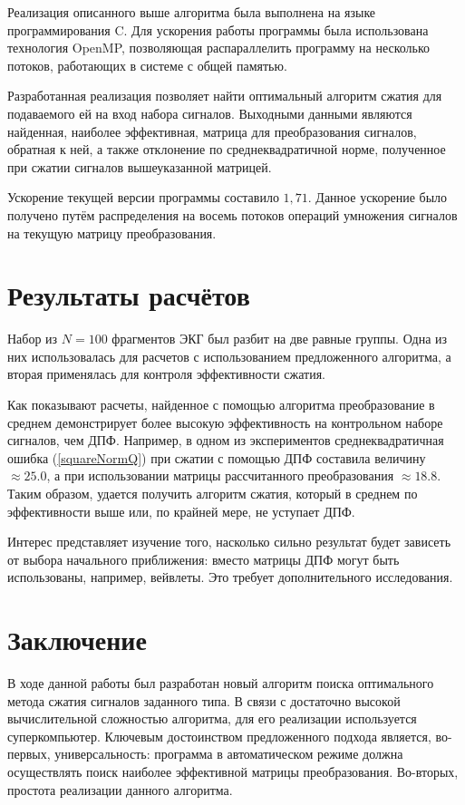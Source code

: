 \documentclass[11pt, oneside, a4paper]{article}
\begin{document}
Реализация описанного выше алгоритма была выполнена на языке программирования C. Для ускорения работы программы была использована технология OpenMP, позволяющая распараллелить программу на несколько потоков, работающих в системе с общей памятью. 

Разработанная реализация позволяет найти оптимальный алгоритм сжатия для подаваемого ей на вход набора сигналов. Выходными данными являются найденная, наиболее эффективная, матрица для преобразования сигналов, обратная к ней, а также отклонение по среднеквадратичной норме, полученное при сжатии сигналов вышеуказанной матрицей.

Ускорение текущей версии программы составило $1,71$. Данное ускорение было получено путём распределения на восемь потоков операций умножения сигналов на текущую матрицу преобразования. 

\section{Результаты расчётов}

Набор из $N = 100$ фрагментов ЭКГ был разбит на две равные группы. Одна из них использовалась для расчетов с использованием предложенного алгоритма, а вторая применялась для контроля эффективности сжатия.

Как показывают расчеты, найденное с помощью алгоритма преобразование в среднем демонстрирует более высокую эффективность на контрольном наборе сигналов, чем ДПФ. Например, в одном из экспериментов среднеквадратичная ошибка (\ref{squareNormQ}) при сжатии с помощью ДПФ составила величину $\approx25.0$, а  при использовании матрицы рассчитанного преобразования $\approx18.8$. Таким образом, удается получить алгоритм сжатия, который в среднем по эффективности выше или, по крайней мере, не уступает ДПФ.

Интерес представляет изучение того, насколько сильно результат будет зависеть от выбора начального приближения: вместо матрицы ДПФ могут быть использованы, например, вейвлеты. Это требует дополнительного исследования. 


\section{Заключение}

В ходе данной работы был разработан новый алгоритм поиска оптимального метода сжатия сигналов заданного типа. В связи с достаточно высокой вычислительной сложностью алгоритма, для его реализации используется суперкомпьютер. Ключевым достоинством предложенного подхода является, во-первых, универсальность: программа в автоматическом режиме должна осуществлять поиск наиболее эффективной матрицы преобразования. Во-вторых, простота реализации данного алгоритма.
\end{document}
